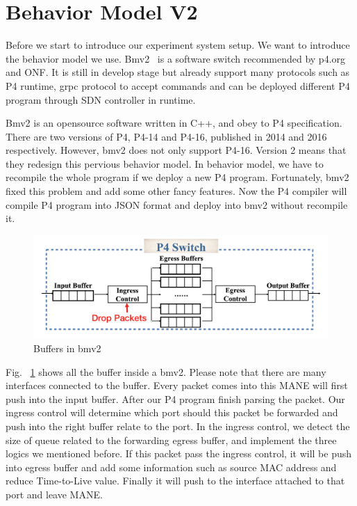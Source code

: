 \section{Behavior Model V2} \label{sec:bmv2}


Before we start to introduce our experiment system setup. We want to introduce the behavior model we use. Bmv2~\cite{bmv2} is a software switch recommended by p4.org and ONF. It is still in develop stage but already support many protocols such as P4 runtime, grpc protocol to accept commands and can be deployed different P4 program through SDN controller in runtime.

Bmv2 is an opensource software written in C++, and obey to P4 specification.
There are two versions of P4, P4-14 and P4-16, published in 2014 and 2016
 respectively. However, bmv2 does not only support P4-16. Version 2 means that they redesign this pervious behavior model. In behavior model, we have to recompile the whole program if we deploy a new P4 program. Fortunately, bmv2 fixed this problem and add some other fancy features. Now the P4 compiler will compile P4 program into JSON format and deploy into bmv2 without recompile it.

\begin{figure}[tbh]
    \centering
    \includegraphics[width=.50\textwidth]{fig/bmv2Buffer.png}
    \caption{Buffers in bmv2}
    \label{bmv2Buffer}
\end{figure}

Fig. ~\ref{bmv2Buffer} shows all the buffer inside a bmv2. Please note that there are many interfaces connected to the buffer. Every packet comes into this MANE will first push into the input buffer. After our P4 program finish parsing the packet. Our ingress control will determine which port should this packet be forwarded and push into the right buffer relate to the port. In the ingress control, we detect the size of queue related to the forwarding egress buffer, and implement the three logics we mentioned before. If this packet pass the ingress control, it will be push into egress buffer and add some information such as source MAC address and reduce Time-to-Live value. Finally it will push to the interface attached to that port and leave MANE.

